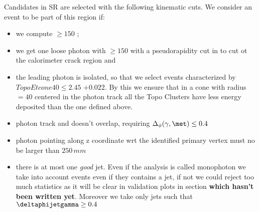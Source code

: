 Candidates in SR are selected with the following kinematic cuts. We consider an event to be part of this region if:
\begin{itemize}
\item we compute \met $ \ge 150 $ \GeV;
\item we get one loose photon with \pt $ \ge 150 $ \GeV with a pseudorapidity cut in  to cut ot the calorimeter crack region and %
\item the leading photon is isolated, so that we select events characterized by $ TopoEtcone40 \le 2.45$ \GeV$ + 0.022 $\pt \GeV. By this we ensure that in a cone with radius \DeltaRdef $ = 40$ centered in the photon track all the Topo Clusters have less energy deposited than the one defined above.
\item photon track and \met doesn't overlap, requiring $\Delta_{\phi}(\gamma,\met) \le 0.4$
\item photon pointing along z coordinate wrt the identified primary vertex must no be larger than $250 \, mm$
\item there is at most one {\itshape good} jet. Even if the analysis is called monophoton we take into account events even if they contains a jet, if not we could reject too much statistics as it will be clear in validation plots in section {\bfseries which hasn't been written yet}. Moreover we take only jets such that $\deltaphijetgamma \ge 0.4$

\end{itemize}

  

  
